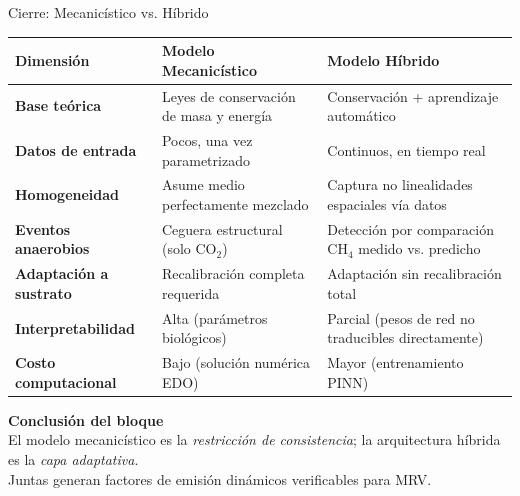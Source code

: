 \documentclass[aspectratio=169, 11pt]{beamer}
\begin{document}
\begin{frame}{Cierre: Mecanicístico vs. Híbrido}
\begin{center}
\begin{tabular}{@{}p{4.2cm}p{5.2cm}p{5.2cm}@{}}
\toprule
\textbf{Dimensión} & \textbf{Modelo Mecanicístico} & \textbf{Modelo Híbrido} \\
\midrule
\textbf{Base teórica} & Leyes de conservación de masa y energía & Conservación + aprendizaje automático \\
\textbf{Datos de entrada} & Pocos, una vez parametrizado & Continuos, en tiempo real \\
\textbf{Homogeneidad} & Asume medio perfectamente mezclado & Captura no linealidades espaciales vía datos \\
\textbf{Eventos anaerobios} & Ceguera estructural (solo CO$_2$) & Detección por comparación CH$_4$ medido vs. predicho \\
\textbf{Adaptación a sustrato} & Recalibración completa requerida & Adaptación sin recalibración total \\
\textbf{Interpretabilidad} & Alta (parámetros biológicos) & Parcial (pesos de red no traducibles directamente) \\
\textbf{Costo computacional} & Bajo (solución numérica EDO) & Mayor (entrenamiento PINN) \\
\bottomrule
\end{tabular}
\end{center}
\vfill
\begin{center}
\textcolor{unalRojo}{\textbf{Conclusión del bloque}}\\[0.2cm]
El modelo mecanicístico es la \textit{restricción de consistencia}; la arquitectura híbrida es la \textit{capa adaptativa}.\\Juntas generan factores de emisión dinámicos verificables para MRV.
\end{center}
\end{frame}
\end{document}

